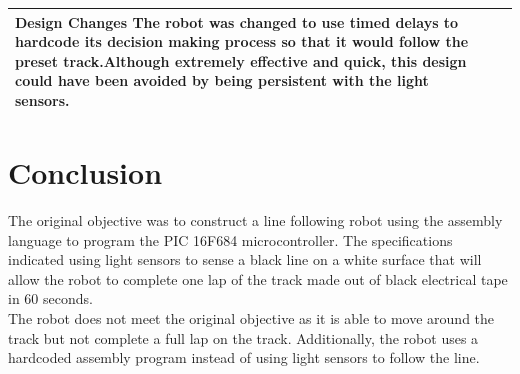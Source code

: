 \documentclass[12pt]{article}
\begin{document}
\begin{table} [h!]
{\begin{tabular}{|p{5cm}|p{5cm}|p{8.5cm}|}
\textbf{Design Changes} The robot was changed to use timed delays to hardcode its decision making process so that it would follow the preset track.Although extremely effective and quick, this design could have been avoided by being persistent with the light sensors.\\
			\hline
		\end{tabular}}
\end{table}
\newpage
\section{Conclusion}
The original objective was to construct a line following robot using the assembly language to program the PIC 16F684 microcontroller. The specifications indicated using light sensors to sense a black line on a white surface that will allow the robot to complete one lap of the track made out of black electrical tape in 60 seconds.
\\[\baselineskip]
The robot does not meet the original objective as it is able to move around the track but not complete a full lap on the track. Additionally, the robot uses a hardcoded assembly program instead of using light sensors to follow the line.
\newpage
\end{document}

